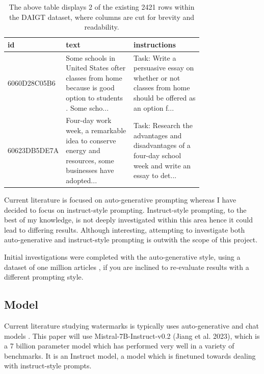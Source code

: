 \documentclass{l4proj}
\theoremstyle{definition}
\newcommand{\codefont}[1]{{\fontfamily{lmtt}\selectfont #1}}
\begin{document}
        \begin{table}[ht]
            \centering
            \small 
            \begin{tabular}{@{}l|p{0.38\linewidth}|p{0.38\linewidth}@{}}
                \toprule
                id & text & instructions \\ \midrule
                6060D28C05B6 & Some schools in United States ofter classes from home because is good option to students . Some scho... & Task: Write a persuasive essay on whether or not classes from home should be offered as an option f... \\ \cmidrule(r){1-3}
                60623DB5DE7A & Four-day work week, a remarkable idea to conserve energy and resources, some businesses have adopted... & Task: Research the advantages and disadvantages of a four-day school week and write an essay to det... \\ \bottomrule
            \end{tabular}
            \captionsetup{width=.95\textwidth}
            \caption{The above table displays 2 of the existing 2421 rows within the DAIGT dataset, where columns are cut for brevity and readability.}
            \label{table:dataset-sample} 
        \end{table}

        Current literature is focused on auto-generative prompting whereas I have decided to focus on instruct-style prompting. Instruct-style prompting, to the best of my knowledge, is not deeply investigated within this area hence it could lead to differing results. Although interesting, attempting to investigate both auto-generative and instruct-style prompting is outwith the scope of this project.
        
        Initial investigations were completed with the auto-generative style, using a dataset of one million articles \citep{Signal1M2016}, if you are inclined to re-evaluate results with a different prompting style.
        
    \subsection{Model}
        Current literature studying watermarks is typically uses auto-generative and chat models \citep{pang2024attacking, liu2024adaptive, kirchenbauer2023watermark, sadasivan2023aigenerated}. This paper will use \codefont{Mistral-7B-Instruct-v0.2} (Jiang et al. 2023), which is a 7 billion parameter model which has performed very well in a variety of benchmarks. It is an Instruct model, a model which is finetuned towards dealing with instruct-style prompts.
\end{document}
